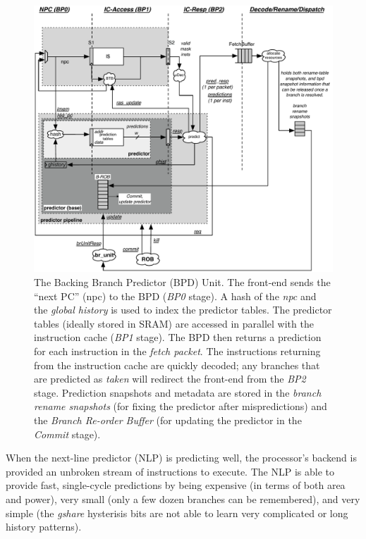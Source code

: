 \begin{figure}[htp]
	\centering
	\centerline{\includegraphics[scale =0.9] {figures/bpd}}
	\caption{ \small The Backing Branch Predictor (BPD) Unit. The front-end sends the ``next PC'' (npc) to the BPD ({\em BP0} stage).  A hash of the {\em npc} and the {\em global history} is used to index the predictor tables.  The predictor tables (ideally stored in SRAM) are accessed in parallel with the instruction cache ({\em BP1} stage). The BPD then returns a prediction for each instruction in the {\em fetch packet}. The instructions returning from the instruction cache are quickly decoded; any branches that are predicted as {\em taken} will redirect the front-end from the {\em BP2} stage.  Prediction snapshots and metadata are stored in the {\em branch rename snapshots} (for fixing the predictor after mispredictions) and the {\em Branch Re-order Buffer} (for updating the predictor in the {\em Commit} stage).}
	\label{fig:bpd}
\end{figure}

When the next-line predictor (NLP) is predicting well, the processor's backend is provided an unbroken stream of instructions to execute. The NLP is able to provide fast, single-cycle predictions by being expensive (in terms of both area and power), very small (only a few dozen branches can be remembered), and very simple (the {\em gshare} hysterisis bits are not able to learn very complicated or long history patterns).

